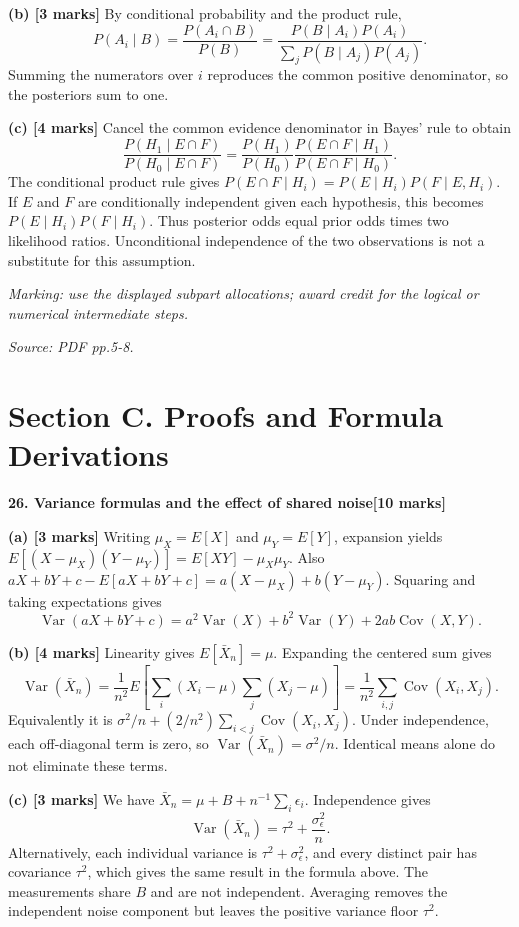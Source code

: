 \documentclass[11pt,a4paper]{article}
\begin{document}
\textbf{(b) [3 marks]} By conditional probability and the product rule, \[P(A_i\mid B)=\frac{P(A_i\cap B)}{P(B)}=\frac{P(B\mid A_i)P(A_i)}{\sum_jP(B\mid A_j)P(A_j)}.\] Summing the numerators over \(i\) reproduces the common positive denominator, so the posteriors sum to one.

\textbf{(c) [4 marks]} Cancel the common evidence denominator in Bayes' rule to obtain \[\frac{P(H_1\mid E\cap F)}{P(H_0\mid E\cap F)}=\frac{P(H_1)}{P(H_0)}\frac{P(E\cap F\mid H_1)}{P(E\cap F\mid H_0)}.\] The conditional product rule gives \(P(E\cap F\mid H_i)=P(E\mid H_i)P(F\mid E,H_i)\). If \(E\) and \(F\) are conditionally independent given each hypothesis, this becomes \(P(E\mid H_i)P(F\mid H_i)\). Thus posterior odds equal prior odds times two likelihood ratios. Unconditional independence of the two observations is not a substitute for this assumption.

\textit{Marking: use the displayed subpart allocations; award credit for the logical or numerical intermediate steps.}\par
{\footnotesize\textit{Source: PDF pp.5-8.}}
\newpage\section*{Section C. Proofs and Formula Derivations}
\textbf{26. Variance formulas and the effect of shared noise}\hfill\textbf{[10 marks]}\par\medskip
\textbf{(a) [3 marks]} Writing \(\mu_X=E[X]\) and \(\mu_Y=E[Y]\), expansion yields \(E[(X-\mu_X)(Y-\mu_Y)]=E[XY]-\mu_X\mu_Y\). Also \(aX+bY+c-E[aX+bY+c]=a(X-\mu_X)+b(Y-\mu_Y)\). Squaring and taking expectations gives \[\operatorname{Var}(aX+bY+c)=a^2\operatorname{Var}(X)+b^2\operatorname{Var}(Y)+2ab\operatorname{Cov}(X,Y).\]

\textbf{(b) [4 marks]} Linearity gives \(E[\bar X_n]=\mu\). Expanding the centered sum gives \[\operatorname{Var}(\bar X_n)=\frac{1}{n^2}E\!\left[\sum_i(X_i-\mu)\sum_j(X_j-\mu)\right]=\frac{1}{n^2}\sum_{i,j}\operatorname{Cov}(X_i,X_j).\] Equivalently it is \(\sigma^2/n+(2/n^2)\sum_{i<j}\operatorname{Cov}(X_i,X_j)\). Under independence, each off-diagonal term is zero, so \(\operatorname{Var}(\bar X_n)=\sigma^2/n\). Identical means alone do not eliminate these terms.

\textbf{(c) [3 marks]} We have \(\bar X_n=\mu+B+n^{-1}\sum_i\epsilon_i\). Independence gives \[\operatorname{Var}(\bar X_n)=\tau^2+\frac{\sigma_\epsilon^2}{n}.\] Alternatively, each individual variance is \(\tau^2+\sigma_\epsilon^2\), and every distinct pair has covariance \(\tau^2\), which gives the same result in the formula above. The measurements share \(B\) and are not independent. Averaging removes the independent noise component but leaves the positive variance floor \(\tau^2\).
\end{document}
